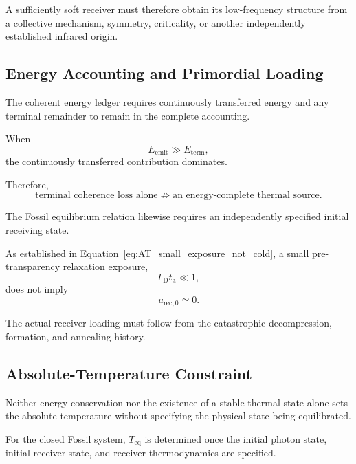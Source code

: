 A sufficiently soft receiver must therefore obtain its low-frequency
structure from a collective mechanism, symmetry, criticality, or another
independently established infrared origin.


\subsection{Energy Accounting and Primordial Loading}

The coherent energy ledger requires continuously transferred energy and any
terminal remainder to remain in the complete accounting.

When
\begin{equation}
    E_{\mathrm{emit}}
    \gg
    E_{\mathrm{term}},
\end{equation}
the continuously transferred contribution dominates.

Therefore,
\begin{equation}
    \text{terminal coherence loss alone}
    \not\Rightarrow
    \text{an energy-complete thermal source}.
    \label{eq:AT_constraint_terminal_only}
\end{equation}

The Fossil equilibrium relation likewise requires an independently specified
initial receiving state.

As established in
Equation~\eqref{eq:AT_small_exposure_not_cold},
a small pre-transparency relaxation exposure,
\begin{equation}
    \Gamma_{\mathrm D}t_{\mathrm a}
    \ll
    1,
\end{equation}
does not imply
\begin{equation}
    u_{\mathrm{rec},0}
    \simeq
    0.
\end{equation}

The actual receiver loading must follow from the catastrophic-decompression,
formation, and annealing history.


\subsection{Absolute-Temperature Constraint}

Neither energy conservation nor the existence of a stable thermal state alone
sets the absolute temperature without specifying the physical state being
equilibrated.

For the closed Fossil system,
\(T_{\mathrm{eq}}\)
is determined once the initial photon state, initial receiver state, and
receiver thermodynamics are specified.

